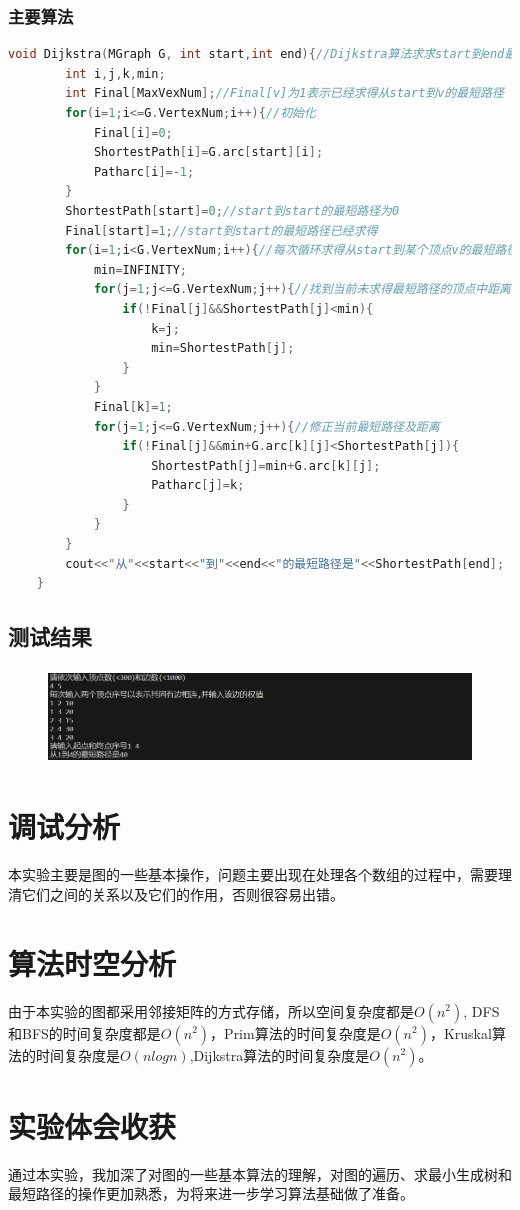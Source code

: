 \documentclass{ctexart}
\begin{document}
	\subsubsection{主要算法}
	\begin{lstlisting}[language=C++, caption=Dijkstra算法求求start到end最短路径]
		void Dijkstra(MGraph G, int start,int end){//Dijkstra算法求求start到end最短路径
		int i,j,k,min;
		int Final[MaxVexNum];//Final[v]为1表示已经求得从start到v的最短路径
		for(i=1;i<=G.VertexNum;i++){//初始化
			Final[i]=0;
			ShortestPath[i]=G.arc[start][i];
			Patharc[i]=-1;
		}
		ShortestPath[start]=0;//start到start的最短路径为0
		Final[start]=1;//start到start的最短路径已经求得
		for(i=1;i<G.VertexNum;i++){//每次循环求得从start到某个顶点v的最短路径
			min=INFINITY;
			for(j=1;j<=G.VertexNum;j++){//找到当前未求得最短路径的顶点中距离start最近的顶点
				if(!Final[j]&&ShortestPath[j]<min){
					k=j;
					min=ShortestPath[j];
				}
			}
			Final[k]=1;
			for(j=1;j<=G.VertexNum;j++){//修正当前最短路径及距离
				if(!Final[j]&&min+G.arc[k][j]<ShortestPath[j]){
					ShortestPath[j]=min+G.arc[k][j];
					Patharc[j]=k;
				}
			}
		}
		cout<<"从"<<start<<"到"<<end<<"的最短路径是"<<ShortestPath[end];
	}	
	\end{lstlisting}
	\subsection{测试结果}
	\begin{figure}[H]
		\centering 
		\includegraphics[height=2.5cm,width=12cm]{3.png}
		\end{figure}
	\section{调试分析}
本实验主要是图的一些基本操作，问题主要出现在处理各个数组的过程中，需要理清它们之间的关系以及它们的作用，否则很容易出错。
	\section{算法时空分析}
	由于本实验的图都采用邻接矩阵的方式存储，所以空间复杂度都是$O(n^2)$,
DFS和BFS的时间复杂度都是$O(n^2)$，Prim算法的时间复杂度是$O(n^2)$，Kruskal算法的时间复杂度是$O(nlogn)$,Dijkstra算法的时间复杂度是$O(n^2)$。
	
	\section{实验体会收获}
通过本实验，我加深了对图的一些基本算法的理解，对图的遍历、求最小生成树和最短路径的操作更加熟悉，为将来进一步学习算法基础做了准备。
	
\end{document}
